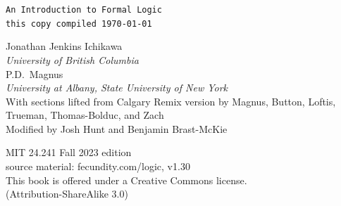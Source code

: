 \thispagestyle{empty}
{\Huge\forallx} %

{\tt An Introduction to Formal Logic\\
this copy compiled \today}
\vfill



{\sf Jonathan Jenkins Ichikawa}\\
\emph{University of British Columbia}
\\
{\sf P.D.\ Magnus}\\
\emph{University at Albany, State University of New York}\\




{\sf With sections lifted from Calgary Remix version by Magnus, Button, Loftis, Trueman, Thomas-Bolduc, and Zach}\\

{\sf Modified by Josh Hunt and Benjamin Brast-McKie}\\




\vfill




{\sf
	MIT 24.241 Fall 2023 edition \\%
	source material: fecundity.com/logic, v1.30\\
	This book is offered under a Creative Commons license.\\
	(Attribution-ShareAlike 3.0)
}



\newpage
\thispagestyle{empty}%


